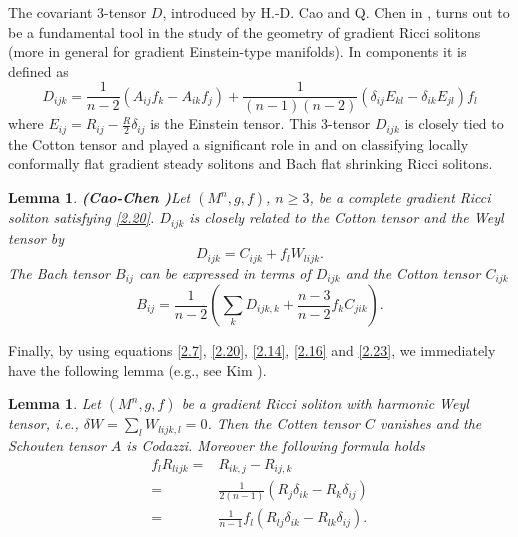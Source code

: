 \documentclass{amsart}
\newtheorem{lemma}[theorem]{Lemma}
\theoremstyle{definition}
\theoremstyle{remark}
\numberwithin{equation}{section}
\begin{document}
	The covariant 3-tensor $D$, introduced by H.-D. Cao and Q. Chen  in \cite{CC1}, 
	turns out to be a fundamental tool in the study of the geometry of gradient Ricci solitons 
	(more in general for gradient Einstein-type manifolds). In components it is defined as
	\begin{equation}\label{2.24}
	D_{ijk} = \frac{1} {n-2} (A_{ij} f_k- A_{ik} f_j) + \frac {1} {(n-1)(n-2)} (\delta_{ij}E_{kl} - \delta_{ik}E_{jl})f_l
	\end{equation}
	where $E_{ij}=R_{ij}-\frac{R}{2}\delta_{ij}$ is the Einstein tensor.
	This 3-tensor $D_{ijk}$ is closely tied to the Cotton tensor and played a significant role in \cite{CC1} and  \cite{CC2} on classifying locally conformally flat gradient steady solitons and Bach flat shrinking Ricci solitons.
	\begin{lemma}{\bf (Cao-Chen \cite{CC1,CC2})}\label{lemma2.2}
		Let $(M^{n}, g, f)$, $ n\geq 3$, be a complete gradient Ricci soliton
		satisfying \eqref{2.20}.  $D_{ijk}$ is closely related to the Cotton tensor and the Weyl tensor by
		\begin{equation}\label{2.26}
		D_{ijk}=C_{ijk}+f_l W_{lijk}.
		\end{equation}
		The  Bach tensor $B_{ij}$ can be expressed in terms of $D_{ijk}$ and the 
		Cotton tensor $C_{ijk}$
		\begin{equation} \label{2.25}
		B_{ij} =\frac{1}{n-2}\left( \sum_kD_{ijk,k}+\frac{n-3}{n-2} f_kC_{jik}\right).
		\end{equation}
	\end{lemma}
	
	\medskip
	Finally, by using equations \eqref{2.7}, \eqref{2.20}, \eqref{2.14}, \eqref{2.16} and \eqref{2.23}, 
	we immediately have the following lemma (e.g., see Kim \cite{Kim}).
		\begin{lemma}\label{lemma2.3}
		Let $(M^{n},g,f)$ be a gradient Ricci soliton with harmonic Weyl tensor, i.e.,
		$\delta W = \sum_l W_{lijk,l} =0$. Then the Cotten tensor $C$ vanishes and 
		the Schouten tensor $A$ is Codazzi.
		Moreover the following formula holds
		\begin{equation}
		\begin{aligned}\label{2.27}
		f_l R_{lijk}=&R_{ik,j}-R_{ij,k}\\
		=&\frac{1}{2(n - 1)} \left( R_j \delta_{ik} - R_k \delta_{ij}\right) \\ 
		=&\frac{1}{n - 1} f_l \left( R_{lj} \delta_{ik} - R_{lk} \delta_{ij}\right).
		\end{aligned}
		\end{equation}
	\end{lemma}
	
\end{document}
